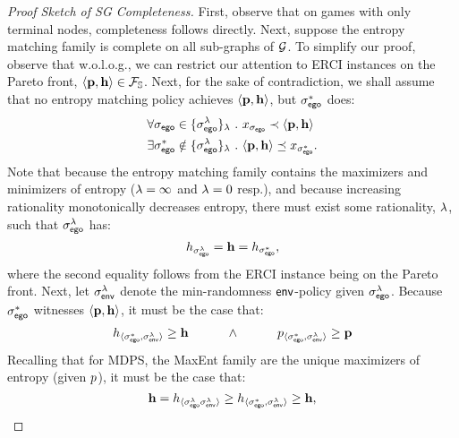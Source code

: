 \begin{proof}[Proof Sketch of SG Completeness]
  First, observe that on games with only terminal nodes, completeness
  follows directly.  Next, suppose the entropy matching family is
  complete on all sub-graphs of $\mathcal{G}$. To simplify our proof, observe
  that w.o.l.o.g., we can restrict our attention to ERCI instances
  on the Pareto front, $\langle \mathbf{p},\mathbf{h}\rangle \in \mathcal{F}_{\mathbb{S}}$.
  Next, for the sake of contradiction, we shall assume that no entropy
  matching policy achieves $\langle \mathbf{p},\mathbf{h}\rangle$,
  but $\sigma_{\mathsf{ego}}^*$ does:
  \begin{align}
    &\forall \sched_\pOne \in \{\sched_{\pOne}^\rat\}_\rat~.~ x_{\sched_{\pOne}} \prec \langle \scthreshold, \randomness \rangle\label{eq:reject}\\
    &\exists \sched_\pOne^* \notin \{\sched_{\pOne}^\rat\}_\rat~.~  \langle \scthreshold, \randomness \rangle \preceq x_{\sched_{\pOne}^*}\label{eq:incomplete}.
  \end{align}
  Note that because the entropy matching family contains the maximizers and minimizers
  of entropy ($\lambda = \infty$ and $\lambda = 0$ resp.), and because increasing rationality monotonically decreases entropy,
  there must exist some rationality, $\lambda$, such that $\sigma_{\mathsf{ego}}^\lambda$ has:
  \begin{equation}
    h_{\sigma_{\mathsf{ego}}^\lambda} = \mathbf{h} = h_{\sigma_{\mathsf{ego}}^*},
  \end{equation}
  where the second equality follows from the ERCI instance being on the Pareto front.
  Next, let $\sigma_{\mathsf{env}}^\lambda$ denote the min-randomness
  $\mathsf{env}$-policy given $\sigma_{\mathsf{ego}}^{\lambda}$. Because $\sigma_{\mathsf{ego}}^*$
  witnesses $\langle\mathbf{p}, \mathbf{h}\rangle$, it must be the case
  that:
  \begin{equation}\label{eq:pareto_bound_for_rat}
    \rndp_{\langle \sched_\pOne^*, \sched_\pTwo^\rat \rangle} \geq \randomness
    \hspace{3em} \wedge \hspace{3em}
    \scp_{\langle \sched_\pOne^*, \sched_\pTwo^\rat\rangle} \geq \scthreshold
  \end{equation}
  Recalling that for MDPS, the MaxEnt family are the unique maximizers of entropy (given $p$),
  it must be the case that:
  \begin{equation}
    \randomness = \rndp_{\langle \sched_\pOne^\rat \sched_\pTwo^\rat \rangle} \geq  \rndp_{\langle \sched_\pOne^*, \sched_\pTwo^\rat \rangle}\geq \randomness,

\end{equation}
\end{proof}
